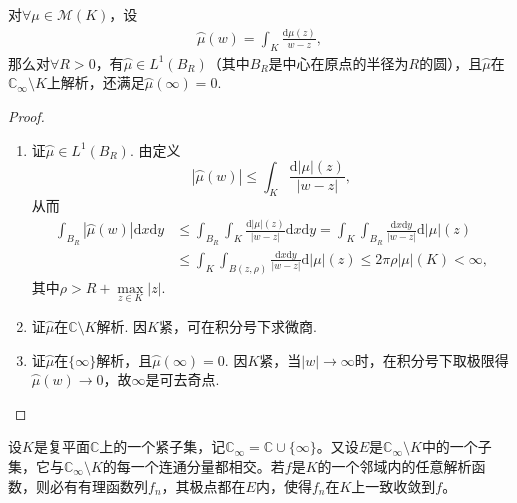 \documentclass[../../main.tex]{subfiles}%
\begin{document}
\begin{lemma}\label{lemma:泛函分析--引理22421}
对$\forall \mu\in\mathscr{M}(K)$，设
\begin{align*}
\wideparen{\mu}(w)=\int_{K}\frac{\mathrm{d}\mu(z)}{w-z},
\end{align*}
那么对$\forall R>0$，有$\wideparen{\mu}\in L^1(B_R)$（其中$B_R$是中心在原点的半径为$R$的圆），且$\wideparen{\mu}$在$\mathbb{C}_\infty\setminus K$上解析，还满足$\wideparen{\mu}(\infty)=0$.
\end{lemma}
\begin{proof}
\begin{enumerate}[(1)]
\item 证$\wideparen{\mu}\in L^1(B_R)$. 由定义
\[
|\wideparen{\mu}(w)|\leqslant\int_{K}\frac{\mathrm{d}|\mu|(z)}{|w-z|},
\]
从而
\begin{align*}
\int_{B_R}|\wideparen{\mu}(w)|\mathrm{d}x\mathrm{d}y&\leqslant\int_{B_R}\int_{K}\frac{\mathrm{d}|\mu|(z)}{|w-z|}\mathrm{d}x\mathrm{d}y
=\int_{K}\int_{B_R}\frac{\mathrm{d}x\mathrm{d}y}{|w-z|}\mathrm{d}|\mu|(z)\\
&\leqslant\int_{K}\int_{B(z,\rho)}\frac{\mathrm{d}x\mathrm{d}y}{|w-z|}\mathrm{d}|\mu|(z)\leqslant2\pi\rho|\mu|(K)<\infty,
\end{align*}
其中$\rho>R+\max\limits_{z\in K}|z|$.

\item 证$\wideparen{\mu}$在$\mathbb{C}\setminus K$解析. 因$K$紧，可在积分号下求微商.

\item 证$\wideparen{\mu}$在$\{\infty\}$解析，且$\wideparen{\mu}(\infty)=0$. 因$K$紧，当$|w|\to\infty$时，在积分号下取极限得$\wideparen{\mu}(w)\to0$，故$\infty$是可去奇点.
\end{enumerate}
\end{proof}

\begin{theorem}[Runge定理]
设$K$是复平面$\mathbb{C}$上的一个紧子集，记$\mathbb{C}_\infty=\mathbb{C}\cup\{\infty\}$。又设$E$是$\mathbb{C}_\infty\setminus K$中的一个子集，它与$\mathbb{C}_\infty\setminus K$的每一个连通分量都相交。若$f$是$K$的一个邻域内的任意解析函数，则必有有理函数列$f_n$，其极点都在$E$内，使得$f_n$在$K$上一致收敛到$f$。
\end{theorem}
\end{document}
